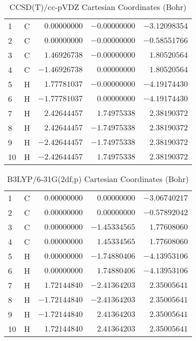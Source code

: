 \documentclass[10pt,oneside]{article}
\begin{document}
\begin{table}[h!]
\centering
\caption{CCSD(T)/cc-pVDZ Cartesian Coordinates (Bohr)}
\begin{tabular}{llrrr}
1  & C  & $ 0.00000000$ & $-0.00000000$ & $-3.12098354$ \\
2  & C  & $ 0.00000000$ & $-0.00000000$ & $-0.58551766$ \\
3  & C  & $ 1.46926738$ & $-0.00000000$ & $ 1.80520564$ \\
4  & C  & $-1.46926738$ & $ 0.00000000$ & $ 1.80520564$ \\
5  & H  & $ 1.77781037$ & $-0.00000000$ & $-4.19174430$ \\
6  & H  & $-1.77781037$ & $ 0.00000000$ & $-4.19174430$ \\
7  & H  & $ 2.42644457$ & $ 1.74975338$ & $ 2.38190372$ \\
8  & H  & $ 2.42644457$ & $-1.74975338$ & $ 2.38190372$ \\
9  & H  & $-2.42644457$ & $-1.74975338$ & $ 2.38190372$ \\
10 & H  & $-2.42644457$ & $ 1.74975338$ & $ 2.38190372$ \\
\end{tabular}
\end{table}

\begin{table}[h!]
\centering
\caption{B3LYP/6-31G(2df,p) Cartesian Coordinates (Bohr)}
\begin{tabular}{llrrr}
1  & C  & $ 0.00000000$ & $ 0.00000000$ & $-3.06740217$ \\
2  & C  & $ 0.00000000$ & $ 0.00000000$ & $-0.57892042$ \\
3  & C  & $ 0.00000000$ & $-1.45334565$ & $ 1.77608060$ \\
4  & C  & $ 0.00000000$ & $ 1.45334565$ & $ 1.77608060$ \\
5  & H  & $ 0.00000000$ & $-1.74880406$ & $-4.13953106$ \\
6  & H  & $ 0.00000000$ & $ 1.74880406$ & $-4.13953106$ \\
7  & H  & $ 1.72144840$ & $-2.41364203$ & $ 2.35005641$ \\
8  & H  & $-1.72144840$ & $-2.41364203$ & $ 2.35005641$ \\
9  & H  & $-1.72144840$ & $ 2.41364203$ & $ 2.35005641$ \\
10 & H  & $ 1.72144840$ & $ 2.41364203$ & $ 2.35005641$ \\
\end{tabular}
\end{table}
\end{document}
